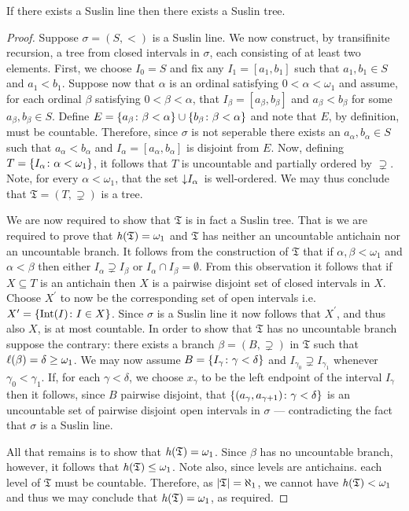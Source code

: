 \begin{lem}
	If there exists a Suslin line then there exists a Suslin tree.
\end{lem}
\begin{proof}
	Suppose $\sigma=(S,<)$ is a Suslin line.  We now construct, by transifinite recursion, a tree from closed intervals in $\sigma$, each consisting of at least two elements.  First, we choose $I_0=S$ and fix any $I_1=[a_1,b_1]$ such that $a_1,b_1\in S$ and $a_1<b_1$.  Suppose now that $\alpha$ is an ordinal satisfying $0<\alpha<\omega_1$ and assume, for each ordinal $\beta$ satisfying $0<\beta<\alpha$, that $I_\beta=[a_\beta,b_\beta]$ and $a_\beta<b_\beta$ for some $a_\beta,b_\beta\in S$.  Define $E=\lbrace a_\beta\colon \beta<\alpha \rbrace\cup\lbrace b_\beta\colon \beta<\alpha \rbrace$ and note that $E$, by definition, must be countable.  Therefore, since $\sigma$ is not seperable there exists an $a_\alpha,b_\alpha\in S$ such that $a_\alpha<b_\alpha$ and $I_\alpha=[a_\alpha,b_\alpha]$ is disjoint from $E$.  Now, defining $T=\lbrace I_\alpha\colon \alpha<\omega_1 \rbrace$, it follows that $T$ is uncountable and partially ordered by $\supsetneq$.  Note, for every $\alpha<\omega_1$, that the set $\left\downarrow I_\alpha\right.$ is well-ordered.  We may thus conclude that $\mathfrak{T}=(T,\supsetneq)$ is a tree.

	We are now required to show that $\mathfrak{T}$ is in fact a Suslin tree.  That is we are required to prove that $\mathit{h}(\mathfrak{T})=\omega_1$ and $\mathfrak{T}$ has neither an uncountable antichain nor an uncountable branch.  It follows from the construction of $\mathfrak{T}$ that if $\alpha,\beta<\omega_1$ and $\alpha<\beta$ then either $I_\alpha\supsetneq I_\beta$ or $I_\alpha\cap I_\beta=\emptyset$.  From this observation it follows that if $X\subseteq T$ is an antichain then $X$ is a pairwise disjoint set of closed intervals in $X$.  Choose $X^\prime$ to now be the corresponding set of open intervals i.e.\ $X^\prime=\lbrace \operatorname{Int}(I)\colon I\in X \rbrace$.  Since $\sigma$ is a Suslin line it now follows that $X^\prime$, and thus also $X$, is at most countable.  In order to show that $\mathfrak{T}$ has no uncountable branch suppose the contrary: there exists a branch $\beta=(B,\supsetneq)$ in $\mathfrak{T}$ such that $\ell(\beta)=\delta\geq\omega_1$.  We may now assume $B=\lbrace I_\gamma\colon \gamma<\delta \rbrace$ and $I_{\gamma_0}\supsetneq I_{\gamma_1}$ whenever $\gamma_0<\gamma_1$.  If, for each $\gamma<\delta$, we choose $x_\gamma$ to be the left endpoint of the interval $I_\gamma$ then it follows, since $B$ pairwise disjoint, that $\lbrace (a_\gamma,a_{\gamma+1})\colon \gamma<\delta \rbrace$ is an uncountable set of pairwise disjoint open intervals in $\sigma$ --- contradicting the fact that $\sigma$ is a Suslin line.

	All that remains is to show that $\mathit{h}(\mathfrak{T})=\omega_1$.  Since $\beta$ has no uncountable branch, however, it follows that $\mathit{h}(\mathfrak{T})\leq\omega_1$.  Note also, since levels are antichains. each level of $\mathfrak{T}$ must be countable.  Therefore, as $\left\lvert\mathfrak{T}\right\rvert=\aleph_1$, we cannot have $\mathit{h}(\mathfrak{T})<\omega_1$ and thus we may conclude that $\mathit{h}(\mathfrak{T})=\omega_1$, as required.
\end{proof}

